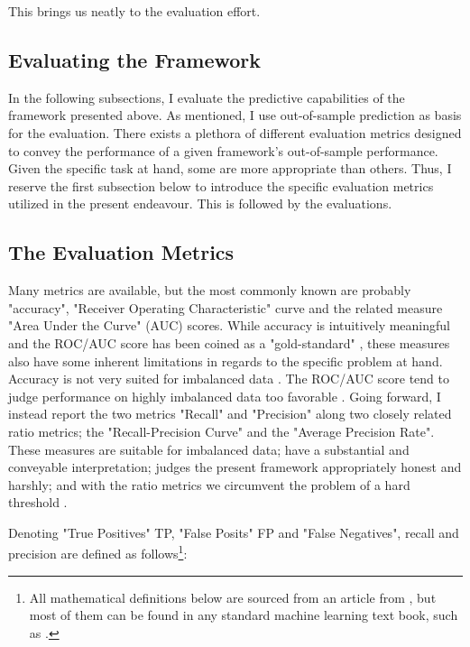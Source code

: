 \documentclass[a4paper]{article}
\begin{document}
This brings us neatly to the evaluation effort.\par

\subsection{Evaluating the Framework}
In the following subsections, I evaluate the predictive capabilities of the framework presented above. As mentioned, I use out-of-sample prediction as basis for the evaluation. There exists a plethora of different evaluation metrics designed to convey the performance of a given framework's out-of-sample performance. Given the specific task at hand, some are more appropriate than others. Thus, I reserve the first subsection below to introduce the specific evaluation metrics utilized in the present endeavour. This is followed by the evaluations.\par

\subsection{The Evaluation Metrics}

Many metrics are available, but the most commonly known are probably "accuracy", "Receiver Operating Characteristic" curve and the related measure "Area Under the Curve" (AUC) scores. While accuracy is intuitively meaningful and the ROC/AUC score has been coined as a "gold-standard" \citep[366]{perry_2013}, these measures also have some inherent limitations in regards to the specific problem at hand. Accuracy is not very suited for imbalanced data \citep[1264]{He_2008}. The ROC/AUC score tend to judge performance on highly imbalanced data too favorable \citep[1278]{He_2008}. Going forward, I instead report the two metrics "Recall" and "Precision" along two closely related ratio metrics; the "Recall-Precision Curve" and the "Average Precision Rate". These measures are suitable for imbalanced data; have a substantial and conveyable interpretation; judges the present framework appropriately honest and harshly; and with the ratio metrics we circumvent the problem of a hard threshold \cite[1278]{He_2008}.

Denoting "True Positives" TP, "False Posits" FP and "False Negatives", recall and precision are defined as follows\footnote{All mathematical definitions below are sourced from an article from \cite{He_2008}, but most of them can be found in any standard machine learning text book, such as \cite{Friedman_2001}.}:
\end{document}
